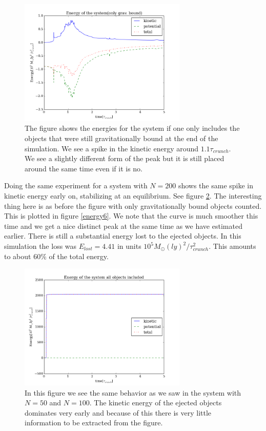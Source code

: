 \documentclass{aa}   %
\begin{document}
\begin{figure}[hbtp]
 \centering
 \includegraphics[width=80mm]{energy4.png}
 \caption[]{\label{energy4}
   The figure shows the energies for the system if one only includes the objects that were still gravitationally bound at the end of the simulation. We see a spike in the kinetic energy around $1.1\tau_{crunch}$. We see a slightly different form of the peak but it is still placed around the same time even if it is no. 
 }
\end{figure}
Doing the same experiment for a system with $N=200$ shows the same spike in kinetic energy early on, stabilizing at an equilibrium. See figure \ref{energy5}. The interesting thing here is as before the figure with only gravitationally bound objects counted. This is plotted in figure \ref{energy6}. We note that the curve is much smoother this time and we get a nice distinct peak at the same time as we have estimated earlier. There is still a substantial energy lost to the ejected objects. In this simulation the loss was $E_{lost} = 4.41$ in units $10^5 M_\odot (ly)^2/\tau_{crunch}^2$. This amounts to about $60\%$ of the total energy. 

\begin{figure}[hbtp]
 \centering
 \includegraphics[width=80mm]{energy5.png}
 \caption[]{\label{energy5}
   In this figure we see the same behavior as we saw in the system with $N=50$ and $N=100$. The kinetic energy of the ejected objects dominates very early and because of this there is very little information to be extracted from the figure. 
 }
\end{figure}
\end{document}
